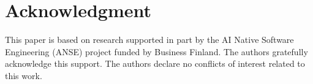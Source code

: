 \documentclass[conference]{IEEEtran}
\begin{document}







\section*{Acknowledgment}
This paper is based on research supported in part by the AI Native Software Engineering (ANSE) project funded by Business Finland. The authors gratefully acknowledge this support. The authors declare no conflicts of interest related to this work.

\end{document}
